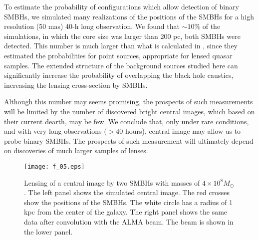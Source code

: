 \documentclass[chicago]{emulateapj}
\begin{document}



To estimate the probability of configurations which allow detection of binary SMBHs, we simulated many realizations of the positions of the SMBHs for a high resolution (50 mas) 40-h long observation. 
We found that $\sim10\%$ of the simulations, in which the core size was larger than 200 pc, both SMBHs were detected. 
This number is much larger than what is calculated in \citet{Li:12}, since they estimated  the probabilities for point sources, appropriate for lensed quasar samples. The extended structure of the background sources studied here can significantly increase the probability of overlapping the black hole caustics, increasing the lensing cross-section by SMBHs.

  Although this number may seems promising, the prospects of such measurements will be limited by the number of discovered bright central images, which based on their current dearth, may be few. We conclude that, only under rare conditions, and with very long observations ($>40$ hours), central image may allow us to probe binary SMBHs. The prospects of such measurement will ultimately depend on discoveries of much larger samples of lenses.




\begin{figure}
\begin{center}
\centering
\texttt{[image: f\_05.eps]}
\centering
\end{center}
\caption{ Lensing of a central image by two SMBHs with masses of $4\times 10^8M_{\odot}$. The left panel shows the simulated central image. The red crosses show the positions of the SMBHs. The white circle has a radius of 1 kpc  from the center of the galaxy. The right panel shows the same data after convolution with the ALMA beam. The beam is shown in the lower panel.
\label{fig:5}}
\end{figure}
\end{document}
